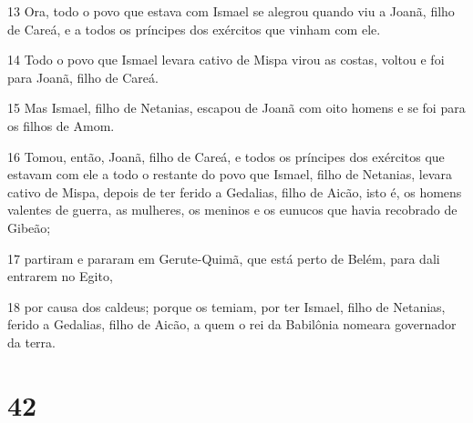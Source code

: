 \par 13 Ora, todo o povo que estava com Ismael se alegrou quando viu a Joanã, filho de Careá, e a todos os príncipes dos exércitos que vinham com ele.
\par 14 Todo o povo que Ismael levara cativo de Mispa virou as costas, voltou e foi para Joanã, filho de Careá.
\par 15 Mas Ismael, filho de Netanias, escapou de Joanã com oito homens e se foi para os filhos de Amom.
\par 16 Tomou, então, Joanã, filho de Careá, e todos os príncipes dos exércitos que estavam com ele a todo o restante do povo que Ismael, filho de Netanias, levara cativo de Mispa, depois de ter ferido a Gedalias, filho de Aicão, isto é, os homens valentes de guerra, as mulheres, os meninos e os eunucos que havia recobrado de Gibeão;
\par 17 partiram e pararam em Gerute-Quimã, que está perto de Belém, para dali entrarem no Egito,
\par 18 por causa dos caldeus; porque os temiam, por ter Ismael, filho de Netanias, ferido a Gedalias, filho de Aicão, a quem o rei da Babilônia nomeara governador da terra.

\chapter{42}

